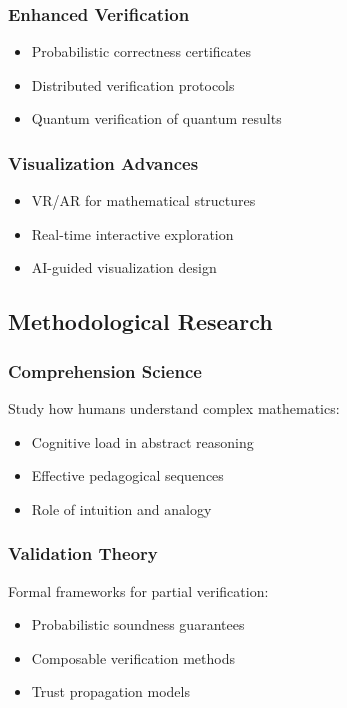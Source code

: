 \documentclass[11pt,a4paper]{article}
\begin{document}
\subsubsection{Enhanced Verification}
\begin{itemize}
\item Probabilistic correctness certificates
\item Distributed verification protocols
\item Quantum verification of quantum results
\end{itemize}

\subsubsection{Visualization Advances}
\begin{itemize}
\item VR/AR for mathematical structures
\item Real-time interactive exploration
\item AI-guided visualization design
\end{itemize}

\subsection{Methodological Research}

\subsubsection{Comprehension Science}
Study how humans understand complex mathematics:
\begin{itemize}
\item Cognitive load in abstract reasoning
\item Effective pedagogical sequences
\item Role of intuition and analogy
\end{itemize}

\subsubsection{Validation Theory}
Formal frameworks for partial verification:
\begin{itemize}
\item Probabilistic soundness guarantees
\item Composable verification methods
\item Trust propagation models
\end{itemize}
\end{document}
